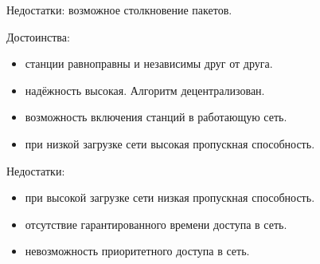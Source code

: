 \documentclass[12pt, russian, oneside, article]{ncc}
\begin{document}
Недостатки: возможное столкновение пакетов.

Достоинства:
\begin{itemize}
\item станции равноправны и независимы друг от друга.
\item надёжность высокая. Алгоритм децентрализован.
\item возможность включения станций в работающую сеть.
\item при низкой загрузке сети высокая пропускная способность.
\end{itemize}

Недостатки:
\begin{itemize}
\item при высокой загрузке сети низкая пропускная способность.
\item отсутствие гарантированного времени доступа в сеть.
\item невозможность приоритетного доступа в сеть.
\end{itemize}
\end{document}
